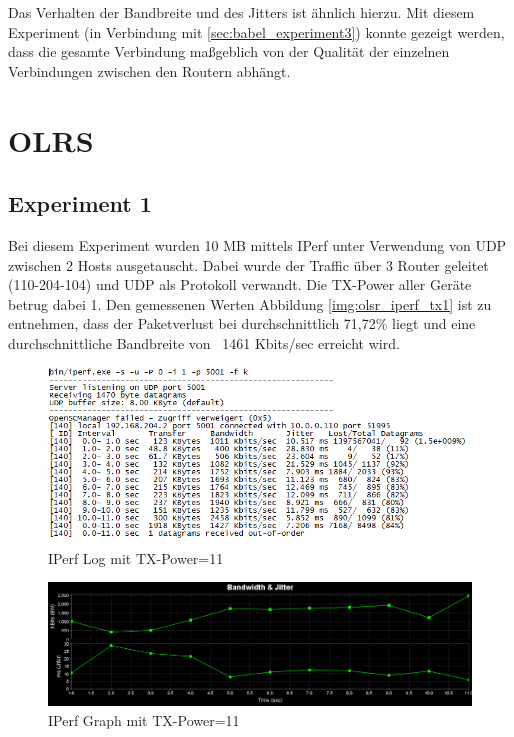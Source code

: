 \documentclass[10pt]{scrartcl}
\begin{document}
Das Verhalten der Bandbreite und des Jitters ist ähnlich hierzu.
Mit diesem Experiment (in Verbindung mit \ref{sec:babel_experiment3}) konnte gezeigt werden, dass die gesamte Verbindung maßgeblich von der Qualität der einzelnen Verbindungen zwischen den Routern abhängt.

\section{OLRS}
	\subsection{Experiment 1}
	Bei diesem Experiment wurden 10 MB mittels IPerf  unter Verwendung von UDP zwischen 2 Hosts ausgetauscht. Dabei wurde der Traffic über 3 Router geleitet (110-204-104) und UDP als Protokoll verwandt. Die TX-Power aller Geräte betrug dabei 1. 
Den gemessenen Werten Abbildung \ref{img:olsr_iperf_tx1} ist zu entnehmen, dass der Paketverlust bei durchschnittlich 71,72\% liegt und eine durchschnittliche Bandbreite von ~1461 Kbits/sec erreicht wird.


	\begin{figure}
        \centering
                \includegraphics[width=\textwidth]{img/OLSR_TX1_Protokoll}
        \caption{IPerf Log mit TX-Power=11}
        \label{img:olsr_iperf_tx11}
	\end{figure}
	
	\begin{figure}
        \centering
                \includegraphics[width=\textwidth]{img/3_UDP_OLSR_10MB}
        \caption{IPerf Graph mit TX-Power=11}
        \label{img:olsr_iperf_graph_tx11}
	\end{figure}
	
\end{document}
